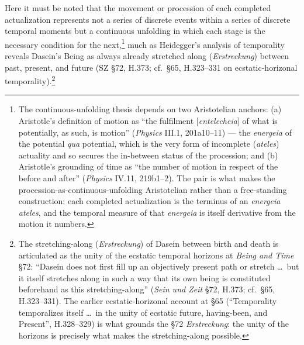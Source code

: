 \documentclass{article}
\begin{document}
Here it must be noted that the movement or procession of each completed actualization represents not a series of discrete events within a series of discrete temporal moments but a continuous unfolding in which each stage is the necessary condition for the next,\footnote{The continuous-unfolding thesis depends on two Aristotelian anchors: (a) Aristotle's definition of motion as ``the fulfilment [\textit{entelecheia}] of what is potentially, as such, is motion'' (\textit{Physics} III.1, 201a10--11) --- the \textit{energeia} of the potential \textit{qua} potential, which is the very form of incomplete (\textit{ateles}) actuality and so secures the in-between status of the procession; and (b) Aristotle's grounding of time as ``the number of motion in respect of the before and after'' (\textit{Physics} IV.11, 219b1--2). The pair is what makes the procession-as-continuous-unfolding Aristotelian rather than a free-standing construction: each completed actualization is the terminus of an \textit{energeia ateles}, and the temporal measure of that \textit{energeia} is itself derivative from the motion it numbers.} much as Heidegger's analysis of temporality reveals Dasein's Being as always already stretched along (\textit{Erstreckung}) between past, present, and future (SZ §72, H.373; cf.~§65, H.323--331 on ecstatic-horizonal temporality).\footnote{The stretching-along (\textit{Erstreckung}) of Dasein between birth and death is articulated as the unity of the ecstatic temporal horizons at \textit{Being and Time} §72: ``Dasein does not first fill up an objectively present path or stretch \ldots\ but it itself stretches along in such a way that its own being is constituted beforehand as this stretching-along'' (\textit{Sein und Zeit} §72, H.373; cf.~§65, H.323--331). The earlier ecstatic-horizonal account at §65 (``Temporality temporalizes itself \ldots\ in the unity of ecstatic future, having-been, and Present'', H.328--329) is what grounds the §72 \textit{Erstreckung}: the unity of the horizons is precisely what makes the stretching-along possible.} 
\end{document}
